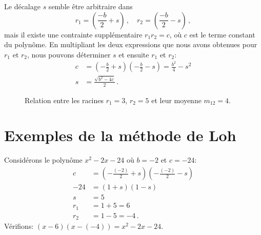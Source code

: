 Le décalage $s$ semble être arbitraire dans
\[
r_1=\left(\frac{-b}{2}+s\right)\,,\quad r_2=\left(\frac{-b}{2}-s\right)\,,
\]
mais il existe une contrainte supplémentaire $r_1r_2=c$, où $c$ est le terme constant du polynôme.
En multipliant les deux expressions que nous avons obtenues pour $r_1$ et $r_2$, nous pouvons déterminer $s$ et ensuite $r_1$ et $r_2$:
\begin{align*}
c&=\left(-\frac{b}{2} +s\right)\left(-\frac{b}{2} -s\right)=
  \frac{b^2}{4}-s^2\\
s&=\frac{\sqrt{b^2-4c}}{2}\,.
\end{align*}

\begin{figure}[htbp]
\centering
{}
\caption{Relation entre les racines $r_1=3$, $r_2=5$ et leur moyenne $m_{12}=4$.}
\label{f.loh-roots2}
\end{figure}

\section{Exemples de la méthode de Loh}\label{s.examples}

\begin{example}
Considérons le polynôme $x^2-2x-24$ où $b=-2$ et $c=-24$:
\begin{align*}
c&=\left(-\frac{(-2)}{2} +s\right)\left(-\frac{(-2)}{2} -s\right)\\
-24&=(1 +s)(1 -s)\\
s&=5\\
r_1&=1+5=6\\
r_2&=1-5=-4\,.
\end{align*}
Vérifions: $(x-6)(x-(-4))= x^2-2x-24$.
\end{example}

